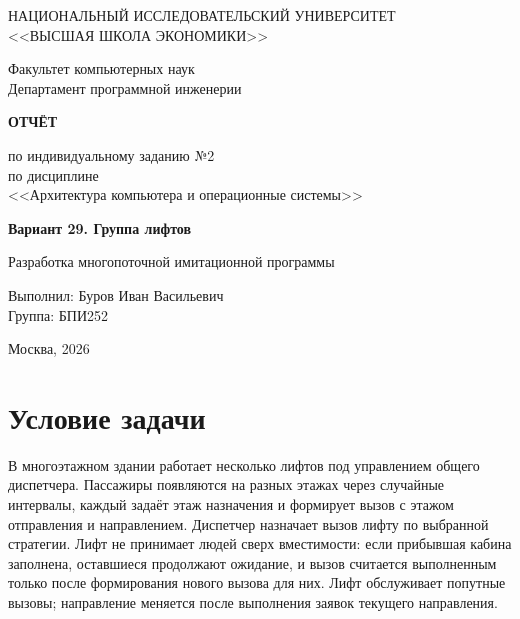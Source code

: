 \documentclass[12pt,a4paper]{article}
\begin{document}
\begin{titlepage}
\centering
\vspace*{20mm}

{\large НАЦИОНАЛЬНЫЙ ИССЛЕДОВАТЕЛЬСКИЙ УНИВЕРСИТЕТ\\
<<ВЫСШАЯ ШКОЛА ЭКОНОМИКИ>>\par}
\vspace{6mm}
{\large Факультет компьютерных наук\\
Департамент программной инженерии\par}

\vfill

{\Large\bfseries ОТЧЁТ\par}
\vspace{4mm}
{\Large по индивидуальному заданию №2\\
по дисциплине\\
<<Архитектура компьютера и операционные системы>>\par}

\vspace{12mm}
{\large\bfseries Вариант 29. Группа лифтов\par}
\vspace{3mm}
{\large Разработка многопоточной имитационной программы\par}

\vfill

\begin{flushright}
{\large Выполнил: Буров Иван Васильевич\\
Группа: БПИ252\par}
\end{flushright}

\vspace{12mm}
{\large Москва, 2026\par}
\end{titlepage}

\section{Условие задачи}

В многоэтажном здании работает несколько лифтов под управлением общего
диспетчера. Пассажиры появляются на разных этажах через случайные
интервалы, каждый задаёт этаж назначения и формирует вызов с этажом
отправления и направлением. Диспетчер назначает вызов лифту по выбранной
стратегии. Лифт не принимает людей сверх вместимости: если прибывшая
кабина заполнена, оставшиеся продолжают ожидание, и вызов считается
выполненным только после формирования нового вызова для них. Лифт
обслуживает попутные вызовы; направление меняется после выполнения заявок
текущего направления.
\end{document}
